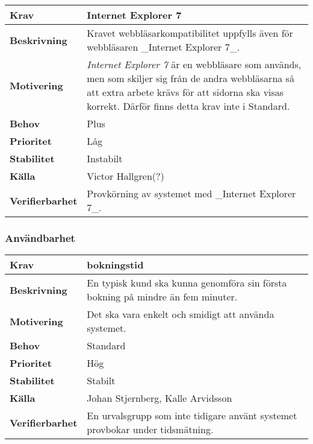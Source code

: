 \documentclass[a4paper, twoside, 11pt, titlepage]{article}
\begin{document}
		\begin{tabular} { | p{3cm} | p{12.2cm} | }
			\hline
			\textbf{Krav} & Internet Explorer 7  \\
			\hline
			\textbf{Beskrivning} & Kravet webbläsarkompatibilitet uppfylls även för webbläsaren \_Internet Explorer 7\_.  \\
			\hline
			\textbf{Motivering} &  \emph{Internet Explorer 7} är en webbläsare som används, men som skiljer sig från de andra webbläsarna så att extra arbete krävs för att sidorna ska visas korrekt. Därför finns detta krav inte i Standard.  \\
			\hline
			\textbf{Behov} & Plus  \\
			\hline
			\textbf{Prioritet} & Låg  \\
			\hline
			\textbf{Stabilitet} & Instabilt  \\
			\hline
			\textbf{Källa} & Victor Hallgren(?)  \\
			\hline
			\textbf{Verifierbarhet} & Provkörning av systemet med \_Internet Explorer 7\_.  \\
			\hline
		\end{tabular}


	\subsubsection{Användbarhet}


		\begin{tabular} { | p{3cm} | p{12.2cm} | }
			\hline
			\textbf{Krav} & bokningstid  \\
			\hline
			\textbf{Beskrivning} & En typisk kund ska kunna genomföra sin första bokning på mindre än fem minuter.  \\
			\hline
			\textbf{Motivering} & Det ska vara enkelt och smidigt att använda systemet.  \\
			\hline
			\textbf{Behov} & Standard  \\
			\hline
			\textbf{Prioritet} & Hög  \\
			\hline
			\textbf{Stabilitet} & Stabilt  \\
			\hline
			\textbf{Källa} & Johan Stjernberg, Kalle Arvidsson  \\
			\hline
			\textbf{Verifierbarhet} & En urvalsgrupp som inte tidigare använt systemet provbokar under tidsmätning.  \\
			\hline
		\end{tabular}
\end{document}

